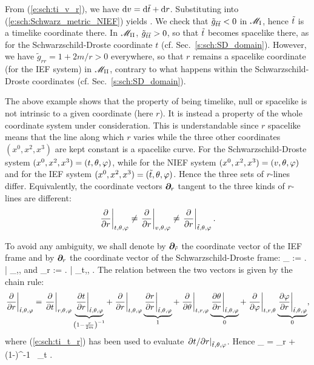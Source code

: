 From (\ref{e:sch:ti_v_r}), we have $\mathrm{d} v = \mathrm{d}{\tilde t} + \mathrm{d} r$. Substituting
into (\ref{e:sch:Schwarz_metric_NIEF}) yields
\be \label{e:sch:Schwarz_metric_EF}
    .
\ee
We check that $\tilde{g}_{{\tilde t}{\tilde t}} < 0$ in $\mathscr{M}_{\rm I}$, hence ${\tilde t}$ is
a timelike coordinate there.
In $\mathscr{M}_{\rm II}$, $\tilde{g}_{{\tilde t}{\tilde t}} > 0$, so that ${\tilde t}$ becomes spacelike
there, as for the Schwarzschild-Droste coordinate $t$ (cf. Sec.~\ref{s:sch:SD_domain}).
However, we have $\tilde{g}_{rr} = 1+2m/r > 0$ everywhere, so that $r$ remains a spacelike coordinate (for the IEF system) in
$\mathscr{M}_{\rm II}$, contrary to what happens within the Schwarzschild-Droste coordinates
(cf. Sec.~\ref{s:sch:SD_domain}).

\begin{remark}
The above example shows that the property of being timelike, null or spacelike
is not intrinsic to a given coordinate (here $r$). It is instead a property
of the whole coordinate system under consideration. This is understandable
since $r$ spacelike means that the line along which $r$ varies while the
three other coordinates $(x^0,x^2,x^3)$ are kept constant is a spacelike curve.
For the Schwarzschild-Droste system $(x^0,x^2,x^3) = (t,\theta,\varphi)$,
while for the NIEF system
$(x^0,x^2,x^3) = (v,\theta,\varphi)$ and for
the IEF system $(x^0,x^2,x^3) = ({\tilde t},\theta,\varphi)$.
Hence the three sets of $r$-lines differ.
Equivalently, the coordinate vectors $\bm{\partial}_r$
tangent to the three kinds of $r$-lines are different:
\[
    \left. \frac{\partial }{\partial r} \right| _{t,\theta,\varphi} \not=
    \left. \frac{\partial }{\partial r} \right| _{v,\theta,\varphi} \not=
    \left. \frac{\partial }{\partial r} \right| _{{\tilde t},\theta,\varphi} .
\]
\end{remark}
To avoid any ambiguity, we shall denote by $\bm{\partial}_{\tilde{r}}$ the
coordinate vector of the IEF frame and by
$\bm{\partial}_r$ the coordinate vector of the Schwarzschild-Droste frame:
\be
    \wpar_{} := \left.  \right| _{\ti,\th,\ph}
    \qquad\mbox{and}\qquad
    \wpar_r := \left.  \right| _{t,\th,\ph} .
\ee
The relation between the two vectors is given by the chain rule:
\[
    \left. \frac{\partial }{\partial r} \right| _{{\tilde t},\theta,\varphi}  =
    \left. \frac{\partial }{\partial t} \right| _{r,\theta,\varphi}
    \underbrace{ \left. \frac{\partial t}{\partial r} \right| _{{\tilde t},\theta,\varphi}}_{\left(1-\frac{r}{2m}\right)^{-1}}
  + \left. \frac{\partial }{\partial r} \right| _{t,\theta,\varphi}
   \underbrace{\left. \frac{\partial r}{\partial r} \right| _{{\tilde t},\theta,\varphi}}_{1}
  + \left. \frac{\partial }{\partial \theta} \right| _{t,r,\varphi}
  \underbrace{\left. \frac{\partial \theta}{\partial r} \right| _{{\tilde t},\theta,\varphi}}_{0}
  + \left. \frac{\partial }{\partial \varphi} \right| _{t,r,\theta}
  \underbrace{\left. \frac{\partial \varphi}{\partial r} \right| _{{\tilde t},\theta,\varphi}}_{0} ,
\]
where (\ref{e:sch:ti_t_r}) has been used to evaluate
$\left. {\partial t}/{\partial r} \right| _{{\tilde t},\theta,\varphi}$. Hence
\be
    \wpar_{} = \wpar_r + \left(1-\right)^{-1} \, \wpar_t .
\ee

